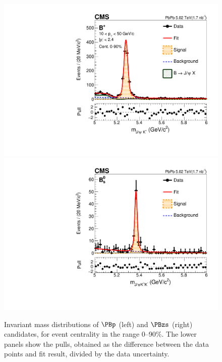\begin{figure}[t]
\centering
\includegraphics[width=.49\textwidth]{mass_bu.pdf}
\includegraphics[width=.49\textwidth]{mass_bs.pdf}
\caption{Invariant mass distributions of $\PBp$ (left) and $\PBzs$ (right) candidates, 
for event centrality in the range 0--90\%. The lower panels show the pulls, obtained as the difference between the data points and fit result, divided by the data uncertainty.}
\label{fig:massPeaks}
\end{figure}

